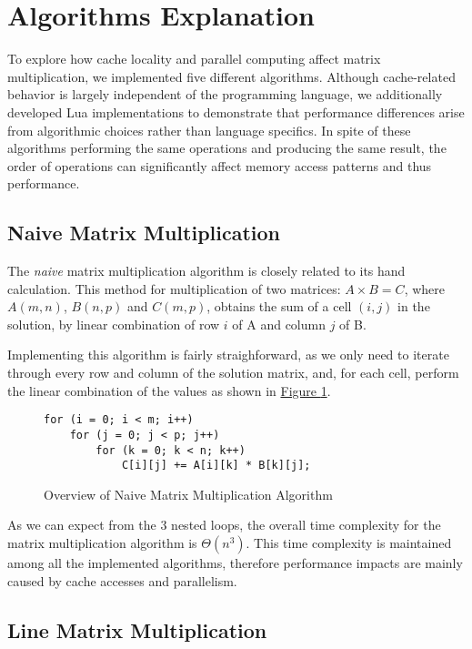 \section{Algorithms Explanation} \label{section:algorithms}

To explore how cache locality and parallel computing affect matrix multiplication, we implemented five different algorithms. Although cache-related behavior is largely independent of the programming language, we additionally developed Lua implementations to demonstrate that performance differences arise from algorithmic choices rather than language specifics. In spite of these algorithms performing the same operations and producing the same result, the order of operations can significantly affect memory access patterns and thus performance.

\subsection{Naive Matrix Multiplication} \label{section:algorithms:naive}

The \textit{naive} matrix multiplication algorithm is closely related to its hand calculation. This method for multiplication of two matrices: $A \times B = C$, where $A(m, n)$, $B(n, p)$ and $C(m, p)$, obtains the sum of a cell $(i,j)$ in the solution, by linear combination of row $i$ of A and column $j$ of B.

Implementing this algorithm is fairly straighforward, as we only need to iterate through every row and column of the solution matrix, and, for each cell, perform the linear combination of the values as shown in \hyperref[fig:algo:naive]{Figure \ref{fig:algo:naive}}.

\begin{figure}[ht!]
\begin{verbatim}
for (i = 0; i < m; i++)
    for (j = 0; j < p; j++)
        for (k = 0; k < n; k++)
            C[i][j] += A[i][k] * B[k][j];
\end{verbatim}
\caption{Overview of Naive Matrix Multiplication Algorithm}
\label{fig:algo:naive}
\end{figure}

As we can expect from the 3 nested loops, the overall time complexity for the matrix multiplication algorithm is $\Theta (n^3)$. This time complexity is maintained among all the implemented algorithms, therefore performance impacts are mainly caused by cache accesses and parallelism.

\subsection{Line Matrix Multiplication}

